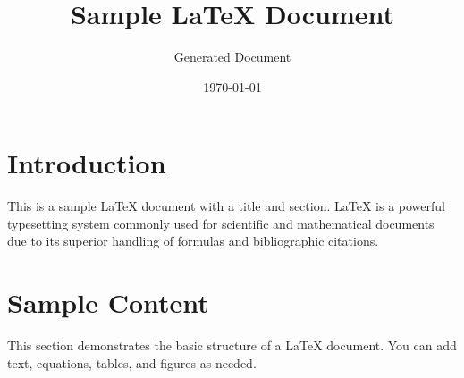 \documentclass{article}
\title{Sample LaTeX Document}
\author{Generated Document}
\date{\today}
\begin{document}
\maketitle

\section{Introduction}
This is a sample LaTeX document with a title and section. LaTeX is a powerful typesetting system commonly used for scientific and mathematical documents due to its superior handling of formulas and bibliographic citations.

\section{Sample Content}
This section demonstrates the basic structure of a LaTeX document. You can add text, equations, tables, and figures as needed.
\end{document}
